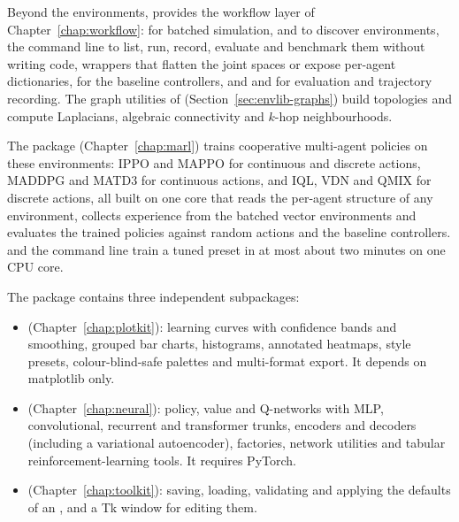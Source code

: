 Beyond the environments,  provides the workflow layer of
Chapter~\ref{chap:workflow}:  for batched simulation,
 and  to discover environments,
the  command line to list, run, record, evaluate and benchmark
them without writing code, wrappers that flatten the joint spaces or expose
per-agent dictionaries,  for the baseline
controllers, and  and  for
evaluation and trajectory recording. The graph utilities of
 (Section~\ref{sec:envlib-graphs}) build
topologies and compute Laplacians, algebraic connectivity and $k$-hop
neighbourhoods.

The  package (Chapter~\ref{chap:marl}) trains
cooperative multi-agent policies on these environments: IPPO and MAPPO for
continuous and discrete actions, MADDPG and MATD3 for continuous actions, and
IQL, VDN and QMIX for discrete actions, all built on one core that reads the
per-agent structure of any environment, collects experience from the batched
vector environments and evaluates the trained policies against random actions
and the baseline controllers.  and the
 command line train a tuned preset in at most about two
minutes on one CPU core.

The  package contains three independent subpackages:

\begin{itemize}
  \item {} (Chapter~\ref{chap:plotkit}): learning curves
    with confidence bands and smoothing, grouped bar charts, histograms,
    annotated heatmaps, style presets, colour-blind-safe palettes and
    multi-format export. It depends on matplotlib only.
  \item {} (Chapter~\ref{chap:neural}): policy,
    value and Q-networks with MLP, convolutional, recurrent and transformer
    trunks, encoders and decoders (including a variational autoencoder),
    factories, network utilities and tabular reinforcement-learning tools.
    It requires PyTorch.
  \item {} (Chapter~\ref{chap:toolkit}): saving, loading,
    validating and applying the defaults of an ,
    and a Tk window for editing them.
\end{itemize}

